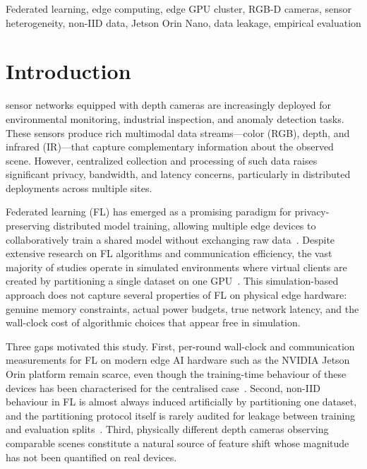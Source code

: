 \documentclass[journal]{IEEEtran}
\begin{document}
\begin{IEEEkeywords}
Federated learning, edge computing, edge GPU cluster, RGB-D cameras, sensor heterogeneity, non-IID data, Jetson Orin Nano, data leakage, empirical evaluation
\end{IEEEkeywords}

\section{Introduction}

 sensor networks equipped with depth cameras are increasingly deployed for environmental monitoring, industrial inspection, and anomaly detection tasks. These sensors produce rich multimodal data streams---color (RGB), depth, and infrared (IR)---that capture complementary information about the observed scene. However, centralized collection and processing of such data raises significant privacy, bandwidth, and latency concerns, particularly in distributed deployments across multiple sites.

Federated learning (FL) has emerged as a promising paradigm for privacy-preserving distributed model training, allowing multiple edge devices to collaboratively train a shared model without exchanging raw data~\cite{mcmahan2017fedavg}. Despite extensive research on FL algorithms and communication efficiency, the vast majority of studies operate in simulated environments where virtual clients are created by partitioning a single dataset on one GPU~\cite{li2020fedprox, kairouz2021advances, seo2025iidnoniid}. This simulation-based approach does not capture several properties of FL on physical edge hardware: genuine memory constraints, actual power budgets, true network latency, and the wall-clock cost of algorithmic choices that appear free in simulation.

Three gaps motivated this study. First, per-round wall-clock and communication measurements for FL on modern edge AI hardware such as the NVIDIA Jetson Orin platform remain scarce, even though the training-time behaviour of these devices has been characterised for the centralised case~\cite{prashanthi2022jetson, banerjee2025fedjoule}. Second, non-IID behaviour in FL is almost always induced artificially by partitioning one dataset, and the partitioning protocol itself is rarely audited for leakage between training and evaluation splits~\cite{zhao2018noniid, domini2025profed, borazjani2026embeddings}. Third, physically different depth cameras observing comparable scenes constitute a natural source of feature shift whose magnitude has not been quantified on real devices.
\end{document}
